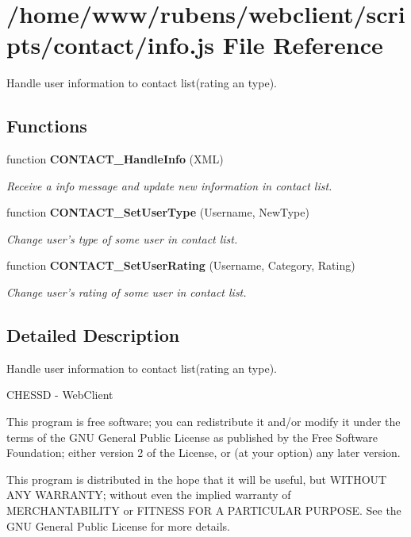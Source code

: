 \section{/home/www/rubens/webclient/scripts/contact/info.js File Reference}
\label{info_8js}
Handle user information to contact list(rating an type). 

\subsection*{Functions}
\begin{CompactItemize}
\item 
function {\bf CONTACT\_\-HandleInfo} (XML)
\begin{CompactList}\small\item\em Receive a info message and update new information in contact list. \item\end{CompactList}\item 
function {\bf CONTACT\_\-SetUserType} (Username, NewType)
\begin{CompactList}\small\item\em Change user's type of some user in contact list. \item\end{CompactList}\item 
function {\bf CONTACT\_\-SetUserRating} (Username, Category, Rating)
\begin{CompactList}\small\item\em Change user's rating of some user in contact list. \item\end{CompactList}\end{CompactItemize}


\subsection{Detailed Description}
Handle user information to contact list(rating an type). 

CHESSD - WebClient

This program is free software; you can redistribute it and/or modify it under the terms of the GNU General Public License as published by the Free Software Foundation; either version 2 of the License, or (at your option) any later version.

This program is distributed in the hope that it will be useful, but WITHOUT ANY WARRANTY; without even the implied warranty of MERCHANTABILITY or FITNESS FOR A PARTICULAR PURPOSE. See the GNU General Public License for more details.

